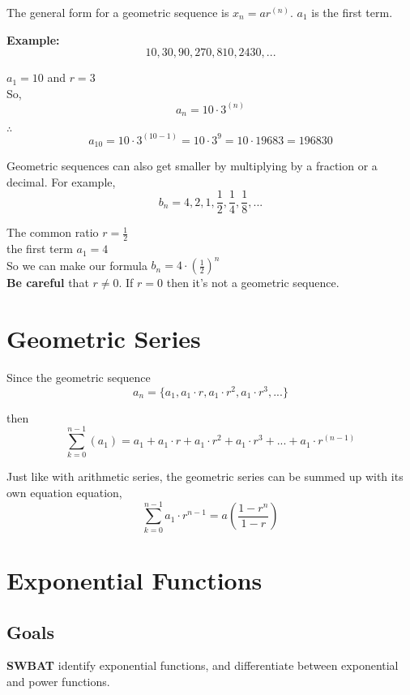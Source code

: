 \documentclass[12pt]{article}
\begin{document}
The general form for a geometric sequence is $x_n=ar^{(n)}$. $a_1$ is the first term.

\textbf{Example:}\\

$$10, 30, 90, 270, 810, 2430, ...$$

$a_1=10$ and $r=3$\\

So, $$a_n=10\cdot 3^{(n)}$$

$\therefore$ $$ a_{10}=10\cdot 3^{(10-1)}=10 \cdot 3^9 = 10 \cdot 19683 = 196830$$

Geometric sequences can also get smaller by multiplying by a fraction or a decimal. For example, $$b_n=4,2,1,\frac{1}{2},\frac{1}{4},\frac{1}{8},...$$

The common ratio $r=\frac{1}{2}$\\

the first term $a_1=4$\\

So we can make our formula $b_n=4\cdot \left(\frac{1}{2}\right)^{n}$\\

\textbf{Be careful}  that $r\neq 0$. If $r=0$ then it's not a geometric sequence.\\


\section{Geometric Series}

Since the geometric sequence $$a_n= \{a_1, a_1 \cdot r, a_1 \cdot r^2, a_1 \cdot r^3, ...\}$$

then $$\sum\limits_{k=0}^{n-1}(a_1)= a_1 + a_1 \cdot r + a_1 \cdot r^2 + a_1 \cdot r^3 + ... + a_1 \cdot r^{(n-1)}$$

Just like with arithmetic series, the geometric series can be summed up with its own equation equation, $$\sum\limits_{k=0}^{n-1}a_1 \cdot r^{n-1}=a\left(\frac{1-r^n}{1-r}\right)$$


\section*{Exponential Functions}


\subsection*{Goals}

\textbf{SWBAT} identify exponential functions, and differentiate between exponential and power functions.\\
\end{document}
